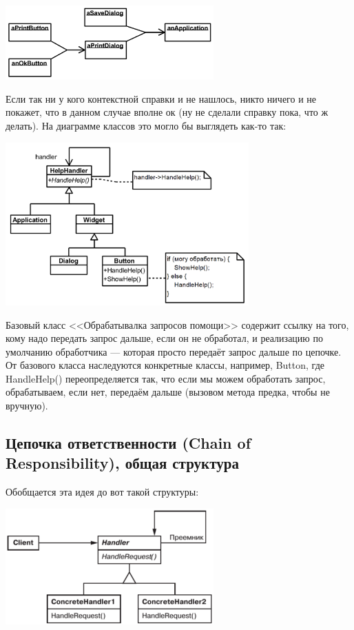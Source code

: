 \documentclass{../../text-style}
\begin{document}
\begin{center}
    \includegraphics[width=0.6\textwidth]{chainOfResponsibilityExample.png}
\end{center}

Если так ни у кого контекстной справки и не нашлось, никто ничего и не покажет, что в данном случае вполне ок (ну не сделали справку пока, что ж делать). На диаграмме классов это могло бы выглядеть как-то так:

\begin{center}
    \includegraphics[width=0.7\textwidth]{chainOfResponsibilityExampleClasses.png}
\end{center}

Базовый класс <<Обрабатывалка запросов помощи>> содержит ссылку на того, кому надо передать запрос дальше, если он не обработал, и реализацию по умолчанию обработчика --- которая просто передаёт запрос дальше по цепочке. От базового класса наследуются конкретные классы, например, Button, где HandleHelp() переопределяется так, что если мы можем обработать запрос, обрабатываем, если нет, передаём дальше (вызовом метода предка, чтобы не вручную).

\subsection{Цепочка ответственности (Chain of Responsibility), общая структура}

Обобщается эта идея до вот такой структуры:

\begin{center}
    \includegraphics[width=0.6\textwidth]{chainOfResponsibility.png}
\end{center}
\end{document}
